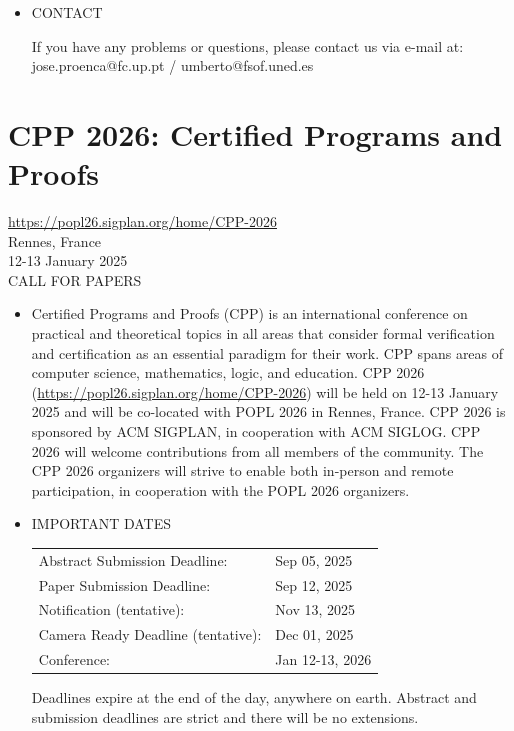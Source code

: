 \documentclass[prodmode,acmtecs]{acmsmall} %
\begin{document}
{\begin{itemize}
\item  CONTACT 
 
  If you have any problems or questions, please contact us via e-mail at: jose.proenca@fc.up.pt / umberto@fsof.uned.es 
 
\end{itemize}\section{CPP 2026: Certified Programs and Proofs}\label{CPP2026}  \href{https://popl26.sigplan.org/home/CPP-2026}{https://popl26.sigplan.org/home/CPP-2026}\\ 
  Rennes, France\\ 
  12-13 January 2025\\ 
CALL FOR PAPERS 

\begin{itemize}\item  Certified Programs and Proofs (CPP) is an international conference on practical and theoretical topics in all areas that consider formal verification and certification as an essential paradigm for their work. CPP spans areas of computer science, mathematics, logic, and education. CPP 2026 (\href{https://popl26.sigplan.org/home/CPP-2026}{https://popl26.sigplan.org/home/CPP-2026}) will be held on 12-13 January 2025 and will be co-located with POPL 2026 in Rennes, France. CPP 2026 is sponsored by ACM SIGPLAN, in cooperation with ACM SIGLOG. CPP 2026 will welcome contributions from all members of the community. The CPP 2026 organizers will strive to enable both in-person and remote participation, in cooperation with the POPL 2026 organizers. 
 
\item  IMPORTANT DATES 
 
\begin{tabulary}{\linewidth}{LL}Abstract Submission Deadline:  & Sep 05, 2025 \\
Paper Submission Deadline:  & Sep 12, 2025 \\
Notification (tentative):  & Nov 13, 2025 \\
Camera Ready Deadline (tentative):  & Dec 01, 2025 \\
Conference:  & Jan 12-13, 2026 \\
\end{tabulary}
 
  Deadlines expire at the end of the day, anywhere on earth. Abstract and submission deadlines are strict and there will be no extensions. 
 

\end{itemize}}
\end{document}
